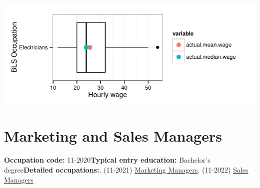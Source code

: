 \documentclass[a4paper,10pt]{article}\usepackage[]{graphicx}\usepackage[]{color}
\makeatletter
\def\maxwidth{ %
  \ifdim\Gin@nat@width>\linewidth
    \linewidth
  \else
    \Gin@nat@width
  \fi
}
\makeatother
\begin{document}
{\centering \includegraphics[width=\maxwidth]{figure/unnamed-chunk-262} 

}


\newpage\section{Marketing and Sales Managers}\textbf{Occupation code:} 11-2020\newline\textbf{Typical entry education:} Bachelor's degree\newline\textbf{Detailed occupations:}. (11-2021)  \href{http://www.bls.gov/oes/current/oes112021.htm}{Marketing Managers}. (11-2022)  \href{http://www.bls.gov/oes/current/oes112022.htm}{Sales Managers}\newline%
\end{document}
